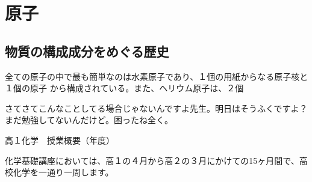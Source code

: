 \documentclass[book, twoside, paper=b5j, fleqn, jafontsize=9pt, jafontscale=1, head_space=22mm, foot_space=9mm, fore-edge=16mm, gutter=25mm, hanging_punctuation]{jlreq}
\begin{document}
\section{原子}
\subsection{物質の構成成分をめぐる歴史}
全ての原子の中で最も簡単なのは水素原子であり、１個の用紙からなる原子核と１個の原子
から構成されている。また、ヘリウム原子は、２個


さてさてこんなことしてる場合じゃないんですよ先生。明日はそうふくですよ？まだ勉強してないんだけど。困ったね全く。




{\HiraKakusix\fontsize{15truept}{15truept}\selectfont\noindent 高１化学　授業概要（{}年度）}

\begin{multicols*}{2}
    \indent 化学基礎講座においては、高１の４月から高２の３月にかけての15ヶ月間で、高校化学を一通り一周します。\\
    \vspace{5truemm}
\end{multicols*}
\end{document}
